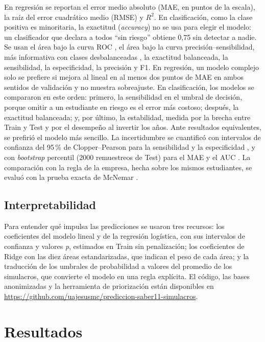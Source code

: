 \documentclass[10pt,letterpaper,twocolumn]{article}
\newcommand{\parencite}{\citep}
\begin{document}
En regresión se reportan el error medio absoluto (MAE, en puntos de la escala), la raíz del error cuadrático medio (RMSE) y $R^2$. En clasificación, como la clase positiva es minoritaria, la exactitud (\textit{accuracy}) no se usa para elegir el modelo: un clasificador que declara a todos \enquote{sin riesgo} obtiene 0,75 sin detectar a nadie. Se usan el área bajo la curva ROC \parencite{fawcett2006roc}, el área bajo la curva precisión--sensibilidad, más informativa con clases desbalanceadas \parencite{saito2015precision}, la exactitud balanceada, la sensibilidad, la especificidad, la precisión y F1. En regresión, un modelo complejo solo se prefiere si mejora al lineal en al menos dos puntos de MAE en ambos sentidos de validación y no muestra sobreajuste. En clasificación, los modelos se compararon en este orden: primero, la sensibilidad en el umbral de decisión, porque omitir a un estudiante en riesgo es el error más costoso; después, la exactitud balanceada; y, por último, la estabilidad, medida por la brecha entre Train y Test y por el desempeño al invertir los años. Ante resultados equivalentes, se prefirió el modelo más sencillo. La incertidumbre se cuantificó con intervalos de confianza del 95\,\% de Clopper--Pearson para la sensibilidad y la especificidad \parencite{clopper1934}, y con \textit{bootstrap} percentil (2000 remuestreos de Test) para el MAE y el AUC \parencite{efron1993}. La comparación con la regla de la empresa, hecha sobre los mismos estudiantes, se evaluó con la prueba exacta de McNemar \parencite{mcnemar1947}.

\subsection{Interpretabilidad}

Para entender qué impulsa las predicciones se usaron tres recursos: los coeficientes del modelo lineal y de la regresión logística, con sus intervalos de confianza y valores \textit{p}, estimados en Train sin penalización; los coeficientes de Ridge con las diez áreas estandarizadas, que indican el peso de cada área; y la traducción de los umbrales de probabilidad a valores del promedio de los simulacros, que convierte el modelo en una regla explícita.
El código, las bases anonimizadas y la herramienta de priorización están disponibles en \url{https://github.com/uajesusmc/prediccion-saber11-simulacros}.

\section{Resultados}
\end{document}
